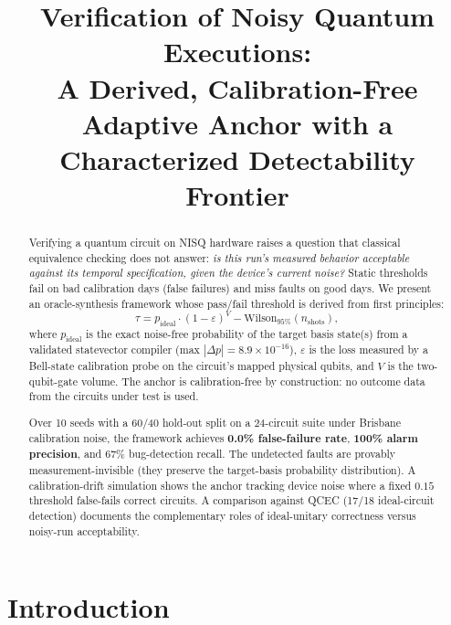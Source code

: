 \documentclass[conference]{IEEEtran}
\title{Verification of Noisy Quantum Executions:\\ A Derived, Calibration-Free
Adaptive Anchor with a Characterized Detectability Frontier}
\author{\IEEEauthorblockN{Y. Agnihotri}
\IEEEauthorblockA{Research project, IEEE QCE 2026 submission}}
\begin{document}
\maketitle

\begin{abstract}
Verifying a quantum circuit on NISQ hardware raises a question that classical
equivalence checking does not answer: \emph{is this run's measured behavior
acceptable against its temporal specification, given the device's current
noise?} Static thresholds fail on bad calibration days (false failures) and
miss faults on good days. We present an oracle-synthesis framework whose
pass/fail threshold is derived from first principles:
\begin{equation}
\tau = p_{\mathrm{ideal}} \cdot (1-\varepsilon)^V - \mathrm{Wilson}_{95\%}(n_{\mathrm{shots}}),
\label{eq:anchor}
\end{equation}
where $p_{\mathrm{ideal}}$ is the exact noise-free probability of the target
basis state(s) from a validated statevector compiler
(max $|\Delta p| = 8.9\times10^{-16}$), $\varepsilon$ is the loss measured by
a Bell-state calibration probe on the circuit's mapped physical qubits, and
$V$ is the two-qubit-gate volume. The anchor is calibration-free by
construction: no outcome data from the circuits under test is used.

Over 10 seeds with a 60/40 hold-out split on a 24-circuit suite under
Brisbane calibration noise, the framework achieves \textbf{0.0\% false-failure
rate}, \textbf{100\% alarm precision}, and 67\% bug-detection recall. The
undetected faults are provably measurement-invisible (they preserve the
target-basis probability distribution). A calibration-drift simulation shows
the anchor tracking device noise where a fixed $0.15$ threshold false-fails
correct circuits. A comparison against QCEC (17/18 ideal-circuit detection)
documents the complementary roles of ideal-unitary correctness versus
noisy-run acceptability.
\end{abstract}

\section{Introduction}
\label{sec:intro}
\end{document}
